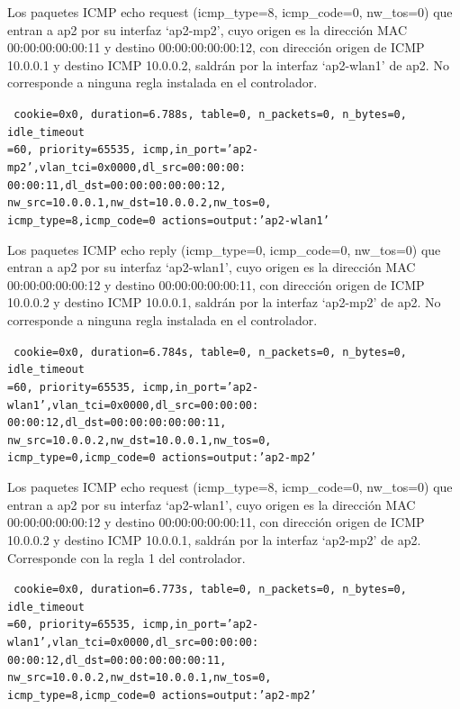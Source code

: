 \documentclass[a4paper,12pt,twoside,spanish]{book}
\begin{document}
Los paquetes ICMP echo request (icmp\_type=8, icmp\_code=0, nw\_tos=0) que entran a ap2 por su interfaz ‘ap2-mp2’, cuyo origen es la dirección MAC 00:00:00:00:00:11 y destino 00:00:00:00:00:12, con dirección origen de ICMP 10.0.0.1 y destino ICMP 10.0.0.2, saldrán por la interfaz ‘ap2-wlan1’ de ap2. No corresponde a ninguna regla instalada en el controlador.\par 

\noindent\texttt{
	cookie=0x0, duration=6.788s, table=0, n\_packets=0, n\_bytes=0, idle\_timeout\\
	=60, priority=65535,
	icmp,in\_port='ap2-mp2',vlan\_tci=0x0000,dl\_src=00:00:00:\\
	00:00:11,dl\_dst=00:00:00:00:00:12,
	nw\_src=10.0.0.1,nw\_dst=10.0.0.2,nw\_tos=0,\\
	icmp\_type=8,icmp\_code=0 actions=output:'ap2-wlan1'
}

Los paquetes ICMP echo reply (icmp\_type=0, icmp\_code=0, nw\_tos=0) que entran a ap2 por su interfaz ‘ap2-wlan1’, cuyo origen es la dirección MAC 00:00:00:00:00:12 y destino 00:00:00:00:00:11, con dirección origen de ICMP 10.0.0.2 y destino ICMP 10.0.0.1, saldrán por la interfaz ‘ap2-mp2’ de ap2. No corresponde a ninguna regla instalada en el controlador.\par 

\noindent\texttt{
	cookie=0x0, duration=6.784s, table=0, n\_packets=0, n\_bytes=0, idle\_timeout\\
	=60, priority=65535,
	icmp,in\_port='ap2-wlan1',vlan\_tci=0x0000,dl\_src=00:00:00:\\
	00:00:12,dl\_dst=00:00:00:00:00:11,
	nw\_src=10.0.0.2,nw\_dst=10.0.0.1,nw\_tos=0,\\
	icmp\_type=0,icmp\_code=0 actions=output:'ap2-mp2'
}

Los paquetes ICMP echo request (icmp\_type=8, icmp\_code=0, nw\_tos=0) que entran a ap2 por su interfaz ‘ap2-wlan1’, cuyo origen es la dirección MAC 00:00:00:00:00:12 y destino 00:00:00:00:00:11, con dirección origen de ICMP 10.0.0.2 y destino ICMP 10.0.0.1, saldrán por la interfaz ‘ap2-mp2’ de ap2. Corresponde con la regla 1 del controlador.\par 

\noindent\texttt{
	cookie=0x0, duration=6.773s, table=0, n\_packets=0, n\_bytes=0, idle\_timeout\\
	=60, priority=65535,
	icmp,in\_port='ap2-wlan1',vlan\_tci=0x0000,dl\_src=00:00:00:\\
	00:00:12,dl\_dst=00:00:00:00:00:11,
	nw\_src=10.0.0.2,nw\_dst=10.0.0.1,nw\_tos=0,\\
	icmp\_type=8,icmp\_code=0 actions=output:'ap2-mp2'
}
\end{document}

